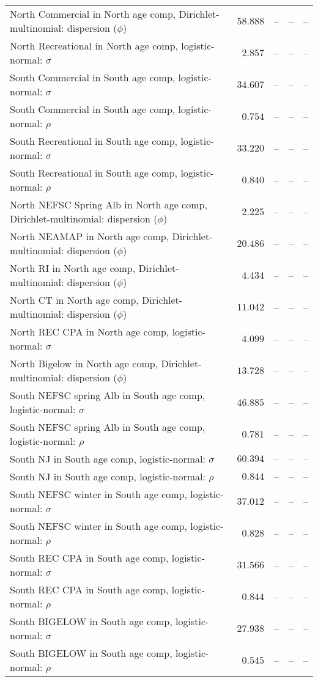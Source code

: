 \documentclass[
]{article}
\begin{document}
\begin{landscape}
\begin{longtable}[t]{lrrrr}
North Commercial in North age comp, Dirichlet-multinomial: dispersion ($\phi$) & $58.888$ & -- & -- & --\\
\addlinespace
North Recreational in North age comp, logistic-normal: $\sigma$ & $2.857$ & -- & -- & --\\
South Commercial in South age comp, logistic-normal: $\sigma$ & $34.607$ & -- & -- & --\\
South Commercial in South age comp, logistic-normal: $\rho$ & $0.754$ & -- & -- & --\\
South Recreational in South age comp, logistic-normal: $\sigma$ & $33.220$ & -- & -- & --\\
South Recreational in South age comp, logistic-normal: $\rho$ & $0.840$ & -- & -- & --\\
\addlinespace
North NEFSC Spring Alb in North age comp, Dirichlet-multinomial: dispersion ($\phi$) & $2.225$ & -- & -- & --\\
North NEAMAP in North age comp, Dirichlet-multinomial: dispersion ($\phi$) & $20.486$ & -- & -- & --\\
North RI in North age comp, Dirichlet-multinomial: dispersion ($\phi$) & $4.434$ & -- & -- & --\\
North CT in North age comp, Dirichlet-multinomial: dispersion ($\phi$) & $11.042$ & -- & -- & --\\
North REC CPA in North age comp, logistic-normal: $\sigma$ & $4.099$ & -- & -- & --\\
\addlinespace
North Bigelow in North age comp, Dirichlet-multinomial: dispersion ($\phi$) & $13.728$ & -- & -- & --\\
South NEFSC spring Alb in South age comp, logistic-normal: $\sigma$ & $46.885$ & -- & -- & --\\
South NEFSC spring Alb in South age comp, logistic-normal: $\rho$ & $0.781$ & -- & -- & --\\
South NJ in South age comp, logistic-normal: $\sigma$ & $60.394$ & -- & -- & --\\
South NJ in South age comp, logistic-normal: $\rho$ & $0.844$ & -- & -- & --\\
\addlinespace
South NEFSC winter in South age comp, logistic-normal: $\sigma$ & $37.012$ & -- & -- & --\\
South NEFSC winter in South age comp, logistic-normal: $\rho$ & $0.828$ & -- & -- & --\\
South REC CPA in South age comp, logistic-normal: $\sigma$ & $31.566$ & -- & -- & --\\
South REC CPA in South age comp, logistic-normal: $\rho$ & $0.844$ & -- & -- & --\\
South BIGELOW in South age comp, logistic-normal: $\sigma$ & $27.938$ & -- & -- & --\\
\addlinespace
South BIGELOW in South age comp, logistic-normal: $\rho$ & $0.545$ & -- & -- & --\\*
\end{longtable}
\end{landscape}
\end{document}
